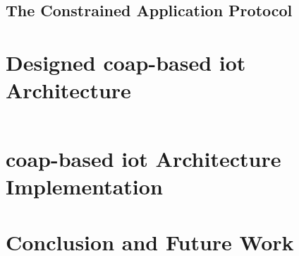 \documentclass[conference]{IEEEtran}
\begin{document}
\subsection{The Constrained Application Protocol}


\section{Designed \gls{coap}-based \gls{iot} Architecture}


\inputminted[fontsize=\footnotesize,linenos,escapeinside=||,tabsize=2,breaklines]{python}{../rpi-coap/rpi-coap.py}

\section{\gls{coap}-based \gls{iot} Architecture Implementation}


\section{Conclusion and Future Work}



\printbibliography
\vspace{12pt}
\end{document}
